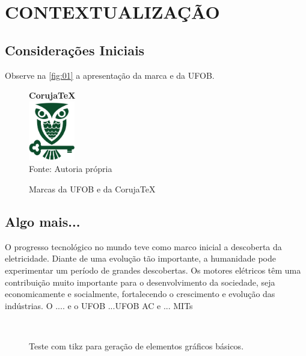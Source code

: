 \chapter{CONTEXTUALIZAÇÃO}{}
\label{cap:02}

\section{Considerações Iniciais}
\lipsum %

Observe na \autoref{fig:01} a apresentação da marca \corujatex e da UFOB.
\begin{figure}[!h]
	\centering
	\caption{Marcas da UFOB e da Coruja\TeX}
	\textbf{\Huge Coruja\TeX} \\
	\includegraphics[width=2cm]{figuras/logo3}\\
	Fonte: Autoria própria
	\label{fig:01}
\end{figure}


\section{Algo mais...}


O progresso tecnológico no mundo teve como marco inicial a descoberta da eletricidade. Diante de uma evolução tão importante, a humanidade pode experimentar um período de grandes descobertas. 
Os motores elétricos têm uma contribuição muito importante para o desenvolvimento da sociedade, seja economicamente e socialmente, fortalecendo o crescimento e evolução das indústrias. O  .... e o \ac{UFOB} ...\ac{UFOB} \ac{AC} e ... \acp{MIT}

\begin{figure}[!h]
	\centering
	\caption{Teste com tikz para geração de elementos gráficos básicos.}
	\\
	\label{fig:}
\end{figure}


